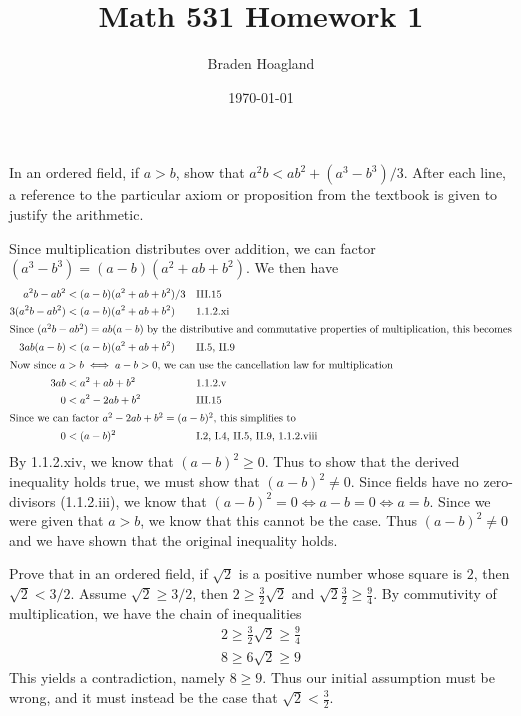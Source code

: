 \documentclass[10pt]{amsart}
\theoremstyle{plain}
\newenvironment{exercise}[1]{%
  \renewcommand\themanualtheoreminner{#1}%
  \manualtheoreminner
}{\endmanualtheoreminner}
\theoremstyle{definition}
\newcommand{\<}{\langle}
\renewcommand{\>}{\rangle}
\begin{document}
%

\title{Math 531 Homework 1}
\author{Braden Hoagland}


\date{\today}

\maketitle


\begin{exercise}{1.1.3}
	In an ordered field, if $a>b$, show that $a^2b < ab^2 + (a^3 - b^3)/3$.
\end{exercise}
After each line, a reference to the particular axiom or proposition from the textbook is given to justify the arithmetic.

Since multiplication distributes over addition, we can factor $(a^3-b^3) = (a-b)(a^2+ab+b^2).$ We then have
\begin{align*}
	a^2 b-ab^2 &< (a-b)(a^2+ab+b^2)/3 && \text{III.15} \\
	3 (a^2 b- ab^2) &< (a-b)(a^2+ab+b^2) && \text{1.1.2.xi} \\
	\intertext{Since $(a^2b - ab^2) = ab(a-b)$ by the distributive and commutative properties of multiplication, this becomes}
	3 ab(a-b) &< (a-b) (a^2+ab+b^2) && \text{II.5, II.9} \\
	\intertext{Now since $a > b \iff a-b>0$, we can use the cancellation law for multiplication}
	3ab &< a^2 + ab + b^2 && \text{1.1.2.v} \\
	0 &< a^2 - 2ab + b^2 && \text{III.15} \\
	\intertext{Since we can factor $a^2 - 2ab + b^2 = (a-b)^2$, this simplifies to}
	0 &< (a-b)^2 && \text{I.2, I.4, II.5, II.9, 1.1.2.viii}
\end{align*}
By 1.1.2.xiv, we know that $(a-b)^2 \geq 0$. Thus to show that the derived inequality holds true, we must show that $(a-b)^2 \neq 0$. 
Since fields have no zero-divisors (1.1.2.iii), we know that $(a-b)^2=0 \iff a-b=0 \iff a=b$. Since we were given that $a>b$, we know that this cannot be the case. Thus $(a-b)^2 \neq 0$ and we have shown that the original inequality holds.

\begin{exercise}{1.1.4}
	Prove that in an ordered field, if $\sqrt{2}$ is a positive number whose square is $2$, then $\sqrt{2}<3/2$.
\end{exercise}
Assume $\sqrt{2} \geq 3/2$, then $2 \geq \frac{3}{2} \sqrt{2}$ and $\sqrt{2} \frac{3}{2} \geq \frac{9}{4}$. By commutivity of multiplication, we have the chain of inequalities
\begin{align*}
	2 \geq \frac{3}{2} \sqrt{2} \geq \frac{9}{4} \\
	8 \geq 6 \sqrt{2} \geq 9
\end{align*}
This yields a contradiction, namely $8 \geq 9$. Thus our initial assumption must be wrong, and it must instead be the case that $\sqrt{2} < \frac{3}{2}$.
\end{document}
